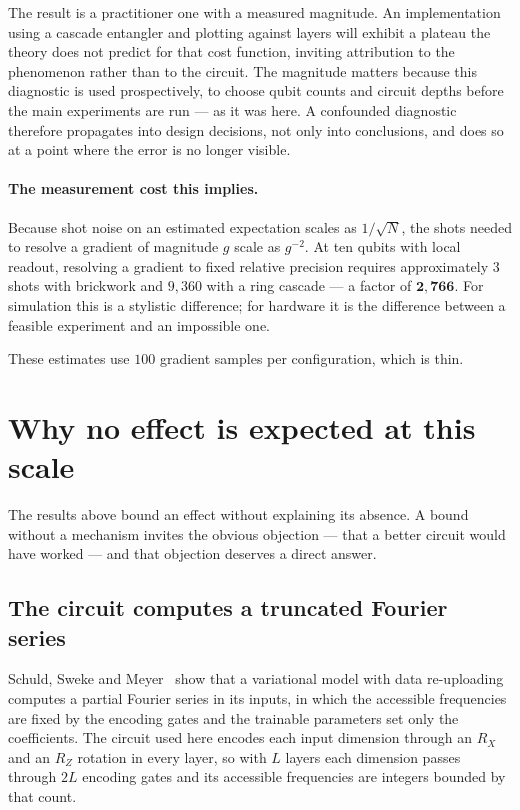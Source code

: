 \documentclass[11pt,onecolumn]{article}
\newif\ifdraft
\newcommand{\pend}[1]{%
  \ifdraft\textcolor{PendFG}{\textbf{[}\textit{#1}\textbf{]}}\fi}
\begin{document}
The result is a practitioner one with a measured magnitude. An
implementation using a cascade entangler and plotting against layers
will exhibit a plateau the theory does not predict for that cost
function, inviting attribution to the phenomenon rather than to the
circuit. The magnitude matters because this diagnostic is used
prospectively, to choose qubit counts and circuit depths before the main
experiments are run --- as it was here. A confounded diagnostic
therefore propagates into design decisions, not only into conclusions,
and does so at a point where the error is no longer visible.

\paragraph{The measurement cost this implies.}
Because shot noise on an estimated expectation scales as $1/\sqrt{N}$,
the shots needed to resolve a gradient of magnitude $g$ scale as
$g^{-2}$. At ten qubits with local readout, resolving a gradient to
fixed relative precision requires approximately $3$ shots with
brickwork and $9{,}360$ with a ring cascade --- a factor of
$\mathbf{2{,}766}$. For simulation this is a stylistic difference; for
hardware it is the difference between a feasible experiment and an
impossible one.

These estimates use $100$ gradient samples per configuration, which is
thin. \pend{rerun at $1{,}000$ samples; roughly one hour}

\section{Why no effect is expected at this scale}\label{sec:why}
The results above bound an effect without explaining its absence. A
bound without a mechanism invites the obvious objection --- that a
better circuit would have worked --- and that objection deserves a
direct answer.

\subsection{The circuit computes a truncated Fourier series}
Schuld, Sweke and Meyer~\cite{schuld2021} show that a variational model
with data re-uploading computes a partial Fourier series in its inputs,
in which the accessible frequencies are fixed by the encoding gates and
the trainable parameters set only the coefficients. The circuit used
here encodes each input dimension through an $R_X$ and an $R_Z$ rotation
in every layer, so with $L$ layers each dimension passes through $2L$
encoding gates and its accessible frequencies are integers bounded by
that count.
\end{document}
